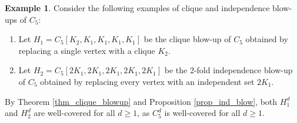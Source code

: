 \documentclass[12pt]{amsart}
\numberwithin{equation}{section}
\theoremstyle{definition}
\newtheorem{exam}[thm]{Example}
\begin{document}
\begin{exam}\label{exam_c5_blowups}
Consider the following examples of clique and independence blow-ups of $C_5$:
\begin{enumerate}[(1)]
    \item Let $H_1 = C_5[K_2, K_1, K_1, K_1, K_1]$ be the clique blow-up of $C_5$ obtained by replacing a single vertex with a clique $K_2$.
    \item Let $H_2 = C_5[2K_1, 2K_1, 2K_1, 2K_1, 2K_1]$ be the $2$-fold independence blow-up of $C_5$ obtained by replacing every vertex with an independent set $2K_1$.
\end{enumerate}
By Theorem \ref{thm_clique_blowup} and Proposition \ref{prop_ind_blow}, both $H_1^d$ and $H_2^d$ are well-covered for all $d \ge 1$, as $C_5^d$ is well-covered for all $d \ge 1$.
\end{exam}
\end{document}
